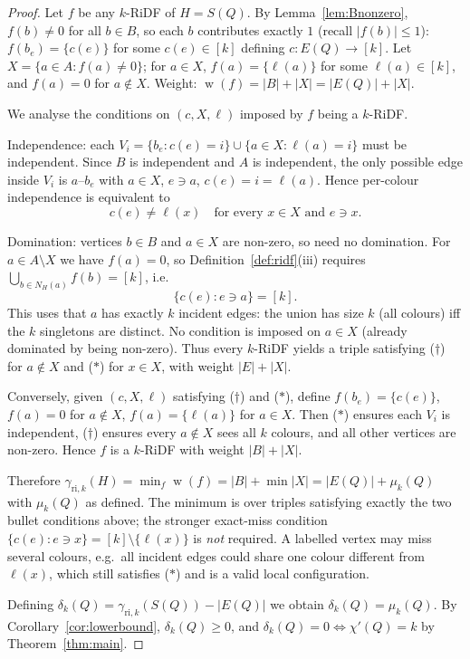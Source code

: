 \documentclass[11pt,a4paper]{article}
\theoremstyle{plain}
\theoremstyle{definition}
\DeclareMathOperator{\weight}{w}
\newcommand{\gri}{\gamma_{\mathrm{ri},k}}
\newcommand{\setK}{[k]}
\begin{document}
\begin{proof}
Let $f$ be any $k$-RiDF of $H=S(Q)$. By Lemma~\ref{lem:Bnonzero}, $f(b)\neq0$ for all $b\in B$, so each $b$ contributes exactly $1$ (recall $|f(b)|\le 1$): $f(b_{e})=\{c(e)\}$ for some $c(e)\in\setK$ defining $c\colon E(Q)\to\setK$.
Let $X=\{a\in A: f(a)\neq0\}$; for $a\in X$, $f(a)=\{\ell(a)\}$ for some $\ell(a)\in\setK$, and $f(a)=0$ for $a\notin X$.
Weight: $\weight(f)=|B|+|X|=|E(Q)|+|X|$.

We analyse the conditions on $(c,X,\ell)$ imposed by $f$ being a $k$-RiDF.

Independence: each $V_{i}=\{b_{e}:c(e)=i\}\cup\{a\in X:\ell(a)=i\}$ must be independent. Since $B$ is independent and $A$ is independent, the only possible edge inside $V_{i}$ is $a$--$b_{e}$ with $a\in X$, $e\ni a$, $c(e)=i=\ell(a)$.
Hence per-colour independence is equivalent to
\[
c(e)\neq\ell(x)\quad\text{for every }x\in X\text{ and }e\ni x. \tag{$\ast$}
\]

Domination: vertices $b\in B$ and $a\in X$ are non-zero, so need no domination.
For $a\in A\setminus X$ we have $f(a)=0$, so Definition~\ref{def:ridf}(iii) requires $\bigcup_{b\in N_{H}(a)}f(b)=\setK$, i.e.
\[
\{c(e): e\ni a\}=\setK. \tag{$\dagger$}
\]
This uses that $a$ has exactly $k$ incident edges: the union has size $k$ (all colours) iff the $k$ singletons are distinct. No condition is imposed on $a\in X$ (already dominated by being non-zero).
Thus every $k$-RiDF yields a triple satisfying ($\dagger$) for $a\notin X$ and ($\ast$) for $x\in X$, with weight $|E|+|X|$.

Conversely, given $(c,X,\ell)$ satisfying ($\dagger$) and ($\ast$), define $f(b_{e})=\{c(e)\}$, $f(a)=0$ for $a\notin X$, $f(a)=\{\ell(a)\}$ for $a\in X$.
Then ($\ast$) ensures each $V_{i}$ is independent, ($\dagger$) ensures every $a\notin X$ sees all $k$ colours, and all other vertices are non-zero. Hence $f$ is a $k$-RiDF with weight $|B|+|X|$.

Therefore $\gri(H)=\min_{f}\weight(f)=|B|+\min|X|=|E(Q)|+\mu_{k}(Q)$ with $\mu_{k}(Q)$ as defined. The minimum is over triples satisfying exactly the two bullet conditions above; the stronger exact-miss condition $\{c(e):e\ni x\}=\setK\setminus\{\ell(x)\}$ is \emph{not} required. A labelled vertex may miss several colours, e.g.\ all incident edges could share one colour different from $\ell(x)$, which still satisfies ($\ast$) and is a valid local configuration.

Defining $\delta_{k}(Q)=\gri(S(Q))-|E(Q)|$ we obtain $\delta_{k}(Q)=\mu_{k}(Q)$. By Corollary~\ref{cor:lowerbound}, $\delta_{k}(Q)\ge0$, and $\delta_{k}(Q)=0\iff\chi'(Q)=k$ by Theorem~\ref{thm:main}.
\end{proof}
\end{document}
